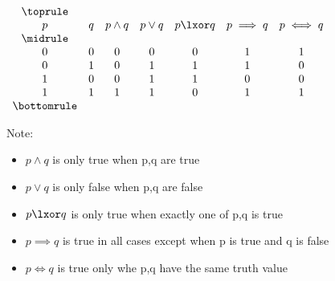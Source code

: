 \documentclass[../../../main.tex]{subfiles}
\begin{document}
\begin{table}[!htb]
    \begin{subtable}{0.5\linewidth}
    $\begin{array}{ *{7}{c} }
        \toprule \\
        p & q & p \land q & p \lor q & p \lxor q & p \implies q & p \iff q \\
        \midrule \\
        0 & 0 & 0 & 0 & 0 & 1 & 1 \\
        0 & 1 & 0 & 1 & 1 & 1 & 0 \\
        1 & 0 & 0 & 1 & 1 & 0 & 0 \\
        1 & 1 & 1 & 1 & 0 & 1 & 1 \\
        \bottomrule
    \end{array}$
    \caption{Other Logical Connectives}
    \label{tbl:logic-connectives}
\end{subtable}
\end{table}

Note:
\begin{itemize}
    \item $p \land q$ is only true when p,q are true
    \item $p \lor q$ is only false when p,q are false
    \item $p \lxor q$ is only true when exactly one of p,q is true
    \item $p \implies q$ is true in all cases except when p is true and q is false
    \item $p \iff q$ is true only whe p,q have the same truth value
\end{itemize}
\end{document}
